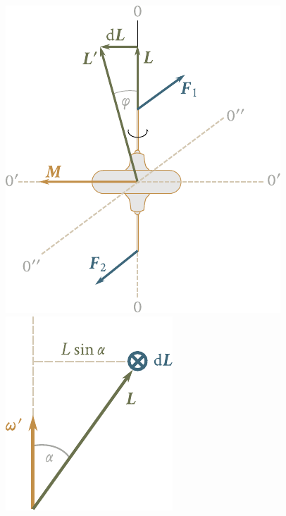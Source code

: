\begin{figure}[!htb]
	\begin{minipage}[t]{0.55\linewidth}
		\begin{center}
			\includegraphics[scale=0.95]{figures/ch_05/fig_5_23.pdf}
			\caption[]{}
			\label{fig:5_23}
		\end{center}
	\end{minipage}
	\hspace{-0.05cm}
	\begin{minipage}[t]{0.45\linewidth}
		\begin{center}
			\includegraphics[scale=0.95]{figures/ch_05/fig_5_24.pdf}
			\caption[]{}
			\label{fig:5_24}
		\end{center}
	\end{minipage}
\end{figure}

